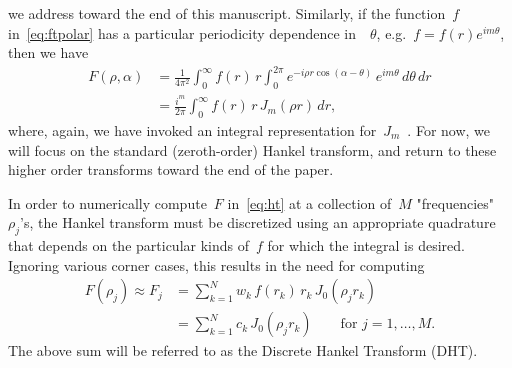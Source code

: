 we address toward the end of this manuscript. Similarly, if the function~$f$
in~\eqref{eq:ftpolar} has a particular periodicity dependence in~~$\theta$,
e.g.~$f = f(r)e^{im\theta}$, then we have
\begin{equation}
  \begin{aligned}
  F(\rho,\alpha) &= \frac{1}{4\pi^2} \int_0^\infty f(r) \, r \int_0^{2\pi} 
  e^{-i \rho r \cos(\alpha - \theta) } \, e^{im\theta}  \, d\theta \, dr \\
  &= \frac{i^m}{2\pi} \int_0^\infty f(r) \, r \, J_m(\rho r)  \, dr,
  \end{aligned}
\end{equation}
where, again, we have invoked an integral representation
for~$J_m$~\cite{olver2010nist}. For now, we will focus on the standard
(zeroth-order) Hankel transform, and return to these higher order transforms
toward the end of the paper.

In order to numerically compute~$F$ in~\eqref{eq:ht} at a collection of~$M$
"frequencies"~$\rho_j$'s, the Hankel transform must be discretized using an
appropriate quadrature that depends on the particular kinds of~$f$ for which the
integral is desired. Ignoring various corner cases, this results in the need for
computing
\begin{equation}
  \begin{aligned}
  F(\rho_j) \approx F_j &= \sum_{k=1}^N w_k \, f(r_k) \, r_k \, J_0(\rho_j r_k) \\
  &= \sum_{k=1}^N c_k \, J_0(\rho_j r_k)
   \qquad \text{for } j = 1, \ldots, M.
  \end{aligned}
\end{equation}
The above sum will be referred to as the Discrete Hankel Transform (DHT). 

